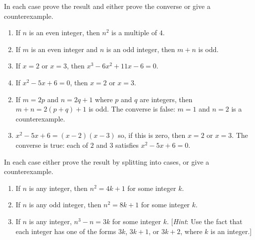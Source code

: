 \begin{multicols}{2}
\begin{ex}
In each case prove the result and either prove the converse or give a counterexample.


\begin{enumerate}[label={\alph*.}]
\item If $n$ is an even integer, then $n^{2}$ is a multiple of $4$.

\item If $m$ is an even integer and $n$ is an odd integer, then $m + n$ is odd.

\item If $x = 2$ or $x = 3$, then $x^{3} - 6x^{2} + 11x - 6 = 0$.

\item If $x^{2} - 5x + 6 = 0$, then $x = 2$ or $x = 3$.

\end{enumerate}
\begin{sol}
\begin{enumerate}[label={\alph*.}]
\setcounter{enumi}{1}
\item  If $m = 2p$ and $n = 2q + 1$ where $p$ and $q$ are integers, then $m + n = 2(p + q) + 1$ is odd. The converse is false: $m = 1$ and $n = 2$ is a counterexample.

\setcounter{enumi}{3}
\item  $x^{2} - 5x + 6 = (x - 2)(x - 3)$ so, if this is zero, then $x = 2$ or $x = 3$. The converse is true: each of $2$ and $3$ satisfies $x^{2} - 5x + 6 = 0$.

\end{enumerate}
\end{sol}
\end{ex}

\begin{ex}
In each case either prove the result by splitting into cases, or give a counterexample.

\begin{enumerate}[label={\alph*.}]
\item If $n$ is any integer, then $n^{2} = 4k + 1$ for some integer $k$.

\item If $n$ is any odd integer, then $n^{2} = 8k + 1$ for some integer $k$.

\item If $n$ is any integer, $n^{3} - n = 3k$ for some integer $k$. [\textit{Hint}: Use the fact that each integer has one of the forms $3k$, $3k + 1$, or $3k + 2$, where $k$ is an integer.]


\end{enumerate}
\end{ex}
\end{multicols}
